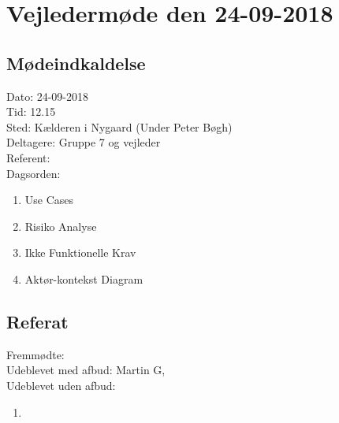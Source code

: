 \documentclass[12pt]{article}
\begin{document}
\section{Vejledermøde den 24-09-2018}
\subsection{Mødeindkaldelse}
Dato: 24-09-2018
\\Tid: 12.15
\\Sted: Kælderen i Nygaard (Under Peter Bøgh)
\\Deltagere: Gruppe 7 og vejleder
\\Referent: 
\\Dagsorden:
\begin{enumerate}
    \item Use Cases
    \item Risiko Analyse
    \item Ikke Funktionelle Krav
    \item Aktør-kontekst Diagram
\end{enumerate}

\subsection{Referat}
 Fremmødte:
 \\Udeblevet med afbud: Martin G,
 \\Udeblevet uden afbud: 
 
 \begin{enumerate}
    \item 
\end{enumerate}
\end{document}
